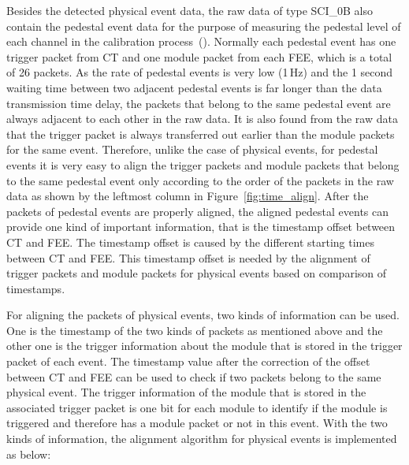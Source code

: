 \documentclass{raa}
\begin{document}
Besides the detected physical event data, the raw data of type SCI\_0B also contain the pedestal event data for the purpose of measuring the pedestal level of each channel in the calibration process~(\citealt{LI20188}). Normally each pedestal event has one trigger packet from CT and one module packet from each FEE, which is a total of 26 packets. As the rate of pedestal events is very low (1\,Hz) and the 1 second waiting time between two adjacent pedestal events is far longer than the data transmission time delay, the packets that belong to the same pedestal event are always adjacent to each other in the raw data. It is also found from the raw data that the trigger packet is always transferred out earlier than the module packets for the same event. Therefore, unlike the case of physical events, for pedestal events it is very easy to align the trigger packets and module packets that belong to the same pedestal event only according to the order of the packets in the raw data as shown by the leftmost column in Figure~\ref{fig:time_align}. After the packets of pedestal events are properly aligned, the aligned pedestal events can provide one kind of important information, that is the timestamp offset between CT and FEE. The timestamp offset is caused by the different starting times between CT and FEE. This timestamp offset is needed by the alignment of trigger packets and module packets for physical events based on comparison of timestamps.

For aligning the packets of physical events, two kinds of information can be used. One is the timestamp of the two kinds of packets as mentioned above and the other one is the trigger information about the module that is stored in the trigger packet of each event. The timestamp value after the correction of the offset between CT and FEE can be used to check if two packets belong to the same physical event. The trigger information of the module that is stored in the associated trigger packet is one bit for each module to identify if the module is triggered and therefore has a module packet or not in this event. With the two kinds of information, the alignment algorithm for physical events is implemented as below:
\end{document}
